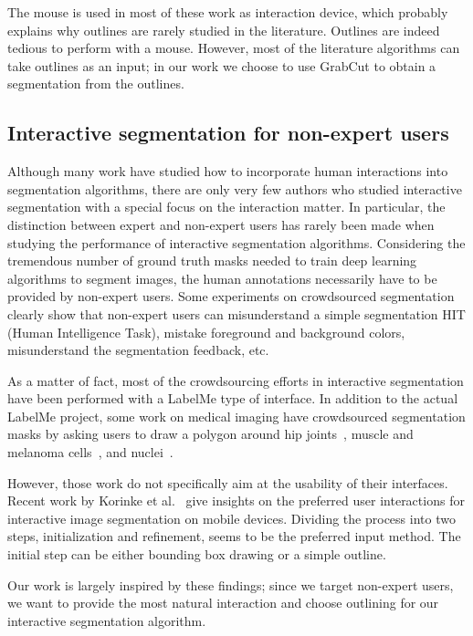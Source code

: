 The mouse is used in most of these work as interaction device,
which probably explains why outlines are rarely studied in the literature.
Outlines are indeed tedious to perform with a mouse.
However, most of the literature algorithms can take outlines as an input;
in our work we choose to use GrabCut to obtain
a segmentation from the outlines.


\subsection{Interactive segmentation for non-expert users}


Although many work have studied how to incorporate human interactions
into segmentation algorithms, there are only very few authors
who studied interactive segmentation with a special focus
on the interaction matter.
In particular, the distinction between expert and non-expert users
has rarely been made when studying
the performance of interactive segmentation algorithms.
Considering the tremendous number of ground truth masks needed
to train deep learning algorithms to segment images,
the human annotations necessarily have to be provided by non-expert users.
Some experiments on crowdsourced
segmentation~\cite{carlier2016assessment} clearly show that
non-expert users can misunderstand a simple
segmentation HIT (Human Intelligence Task),
mistake foreground and background colors,
misunderstand the segmentation feedback, etc.


As a matter of fact, most of the crowdsourcing efforts in interactive
segmentation have been performed with a LabelMe type of interface.
In addition to the actual LabelMe project,
some work on medical imaging have crowdsourced segmentation masks by
asking users to draw a polygon around
hip joints~\cite{chavez2013crowdsourcing},
muscle and melanoma cells~\cite{gurari2015collect},
and nuclei~\cite{irshad2014crowdsourcing}.


However, those work do not specifically aim at
the usability of their interfaces. Recent work by
Korinke et al.~\cite{korinke_intuitive_2015,korinke_exploring_2015}
give insights on the preferred user interactions
for interactive image segmentation on mobile devices.
Dividing the process into two steps, initialization and refinement,
seems to be the preferred input method.
The initial step can be either bounding box drawing or a simple outline.


Our work is largely inspired by these findings;
since we target non-expert users, we want to provide
the most natural interaction and choose outlining
for our interactive segmentation algorithm.



